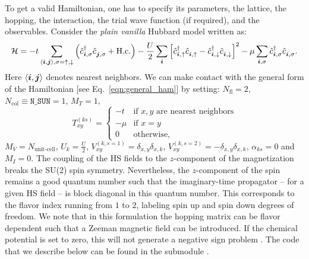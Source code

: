 To get a valid Hamiltonian, one has to specify its parameters, the lattice, the hopping, the interaction, the trial wave function  (if  required), and the observables.  Consider  the  \textit{plain vanilla}  Hubbard model  written as: 
\begin{equation}
\label{eqn_hubbard_Mz}
\mathcal{H}=
- t 
\sum\limits_{\langle \ve{i}, \ve{j} \rangle,  \sigma={\uparrow,\downarrow}} 
  \left(  \hat{c}^{\dagger}_{\ve{i}, \sigma} \hat{c}^{\phantom\dagger}_{\ve{j},\sigma}  + \hc \right) 
- \frac{U}{2}\sum\limits_{\ve{i}}\left[
\hat{c}^{\dagger}_{\ve{i}, \uparrow} \hat{c}^{\phantom\dagger}_{\ve{i}, \uparrow}  -   \hat{c}^{\dagger}_{\ve{i}, \downarrow} \hat{c}^{\phantom\dagger}_{\ve{i}, \downarrow}  \right]^{2}   
-  \mu \sum_{\ve{i},\sigma } \hat{c}^{\dagger}_{\ve{i}, \sigma}  \hat{c}^{\phantom\dagger}_{\ve{i},\sigma}. 
\end{equation} 
Here $ \langle \boldsymbol{i}, \boldsymbol{j} \rangle $    denotes nearest neighbors. 
We can make contact with the general form of the Hamiltonian  [see Eq.~\eqref{eqn:general_ham}] by setting: 
$N_{\mathrm{fl}} = 2$, $N_{\mathrm{col}} \equiv \texttt{N\_SUN}     =1 $, 
 $M_T    =    1$, 
 \begin{equation}
  T^{(ks)}_{x y}   = 
  \left\{ 
 \begin{array}{ll}
       -t         & \text{if } x,y \text{ are nearest neighbors} \\
       -\mu    & \text{if } x = y \\
       0         &  \text{otherwise},
 \end{array}
  \right.
 \end{equation}
 $M_V   =  N_{\text{unit-cell}} $,  $U_{k}       =   \frac{U}{2}$, 
 $V_{x y}^{(k, s=1)} =  \delta_{x,y} \delta_{x,k}  $,  $V_{x y}^{(k, s=2)} =  - \delta_{x,y} \delta_{x,k}  $,  $\alpha_{ks}   = 0  $ and $M_I       = 0 $.   
The coupling of the HS fields to the $z$-component of the magnetization breaks the SU(2) spin symmetry. Nevertheless, the $z$-component of the spin remains a good quantum number such that the imaginary-time propagator -- for a given HS field -- is block  diagonal in this quantum number. This corresponds to the flavor index running from $1$ to $2$,  labeling spin up and spin down degrees of freedom. We note that  in this formulation the  hopping matrix can be flavor dependent such that a Zeeman  magnetic field can be introduced.  If the chemical potential is set to zero, this will not generate a negative sign problem \cite{Wu04,Milat04,Bercx09}.    
The code that we describe below  can be found in the submodule .

